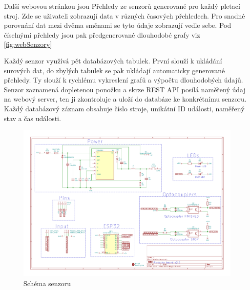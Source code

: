 \documentclass[12pt, a4paper]{article}
\begin{document}
Další webovou stránkou jsou Přehledy ze senzorů generované pro každý pletací stroj.
Zde se uživateli zobrazují data v různých časových přehledech.
Pro snadné porovnání dat mezi dvěma směnami se tyto údaje zobrazují vedle sebe.
Pod číselnými přehledy jsou pak předgenerované dlouhodobé grafy viz \ref{fig:webSenzory}

Každý senzor využívá pět databázových tabulek. První slouží k ukládání surových dat, do zbylých tabulek se pak ukládají automaticky generované přehledy.
Ty slouží k rychlému vykreslení grafů a výpočtu dlouhodobých údajů.
Senzor zaznamená dopletenou ponožku a skrze REST API posílá naměřený údaj na webový server, ten ji zkontroluje a uloží do databáze ke konkrétnímu senzoru.
Každý databázový záznam obsahuje číslo stroje, unikátní ID události, naměřený stav a čas události.

% 
\begin{figure}[htbp]
    \centering
    \includegraphics[width=\textwidth]{DATASHEET/Pletacka_board_v2.pdf}
    \caption{Schéma senzoru}
    \label{fig:Schemav1}
\end{figure}
\end{document}
